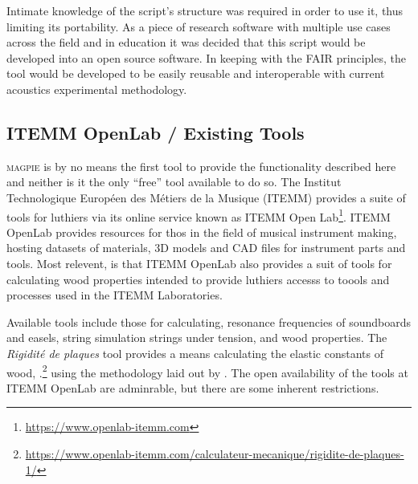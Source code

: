 
Intimate knowledge of the script's structure was required in order to use it, thus limiting its portability. As a piece of research software with multiple use cases across the field and in education it was decided that this script would be developed into an open source software. In keeping with the FAIR principles, the tool would be developed to be easily reusable and interoperable with current acoustics experimental methodology.

\subsection{ITEMM OpenLab / Existing Tools}

\textsc{magpie} is by no means the first tool to provide the functionality described here and neither is it the only ``free'' tool available to do so. The Institut Technologique Européen des Métiers de la Musique (ITEMM) provides a suite of tools for luthiers via its online service known as ITEMM Open Lab\footnote{\url{https://www.openlab-itemm.com}}. ITEMM OpenLab provides resources for thos in the field of musical instrument making, hosting datasets of materials, 3D models and CAD files for instrument parts and tools. Most relevent, is that ITEMM OpenLab also provides a suit of tools for calculating wood properties intended to provide luthiers accesss to toools and processes used in the ITEMM Laboratories.
% 

Available tools include those for calculating, resonance frequencies of soundboards and easels, string simulation strings under tension, and wood properties. The \textit{Rigidité de plaques} tool provides a means calculating the elastic constants of wood, .\footnote{\url{https://www.openlab-itemm.com/calculateur-mecanique/rigidite-de-plaques-1/}} using the methodology laid out by \textcite{mcintyre_measuring_1988}. 
The open availability of the tools at ITEMM OpenLab are adminrable, but there are some inherent restrictions.

